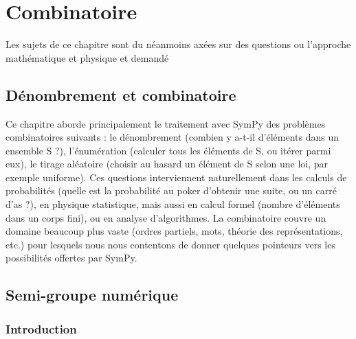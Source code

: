 \part{Combinatoire}

Les sujets de ce chapitre sont du néanmoins axées sur des questions ou l'approche mathématique et 
physique et demandé 

\chapter{Dénombrement et combinatoire}
Ce chapitre aborde principalement le traitement avec SymPy des problèmes
combinatoires suivants : le dénombrement (combien y a-t-il d’éléments dans un
ensemble S ?), l’énumération (calculer tous les éléments de S, ou itérer parmi
eux), le tirage aléatoire (choisir au hasard un élément de S selon une loi, par
exemple uniforme). Ces questions interviennent naturellement dans les calculs de
probabilités (quelle est la probabilité au poker d’obtenir une suite, ou un carré
d’as ?), en physique statistique, mais aussi en calcul formel (nombre d’éléments
dans un corps fini), ou en analyse d’algorithmes. La combinatoire couvre un
domaine beaucoup plus vaste (ordres partiels, mots, théorie des représentations,
etc.) pour lesquels nous nous contentons de donner quelques pointeurs vers les
possibilités offertes par SymPy.
\chapter{Semi-groupe numérique}
\section{Introduction}
 
